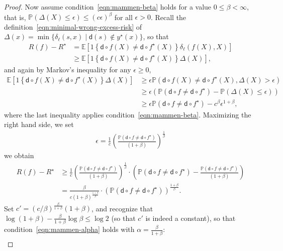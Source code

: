 \documentclass[10pt,a4paper]{amsart}
\newcommand{\E}{\mathbb{E}} %
\renewcommand{\P}{\mathbb{P}} %
\newcommand{\brk}[1]{\left[{#1}\right]} %
\newcommand{\extloss}{\delta_\tloss}
\newcommand{\indic}[1]{1\!\left\{#1\right\}} %
\newcommand{\opt}{^\star} %
\newcommand{\pred}{\mathsf{d}}  %
\newcommand{\prn}[1]{\left({#1}\right)} %
\newcommand{\tloss}{\ell}  %
\begin{document}
\begin{proof}
  Now assume condition~\eqref{eqn:mammen-beta} holds for a value $0 \le \beta
  < \infty$, that is, $\P(\Delta(X) \leq \epsilon) \leq (c \epsilon)^\beta$
  for all $\epsilon > 0$.
  Recall the definition~\eqref{eqn:minimal-wrong-excess-risk}
  of $\Delta(x) = \min\{\extloss(s, x)
  \mid \pred(s) \not \in y\opt(x)\}$,
  so that
  \begin{align*}
    R(f) - R^\star
    & = \mathbb{E} \brk{\indic{\pred \circ f(X) \neq \pred \circ f^\star(X)}
      \extloss(f(X),X) } \\
    & \geq \mathbb{E} \brk{\indic{\pred \circ f(X) \neq \pred \circ f^\star(X)}
      \Delta(X) },
  \end{align*}
  and again by Markov's inequality for any $\epsilon \ge 0$,
  \begin{align}
    \E \brk{\indic{\pred \circ f(X) \neq \pred \circ f^\star(X)} \Delta(X)}
    & \geq  \epsilon \P(\pred \circ f(X) \neq \pred \circ f^\star(X),
    \Delta(X) > \epsilon) \nonumber \\
    & \geq \epsilon \prn{\mathbb{P}(\pred \circ f \neq \pred \circ f^\star)
      - \P(\Delta(X) \leq \epsilon)} \label{eqn:pinto-noir} \\
    & \geq \epsilon \P(\pred \circ f \neq \pred \circ f^\star)
    - c^\beta \epsilon^{1+\beta}, \nonumber
  \end{align}
  where the last inequality applies condition~\eqref{eqn:mammen-beta}.
  Maximizing the right hand side, we set
  \begin{align*}
    \epsilon = \frac{1}{c}\prn{\frac{\P(\pred \circ f \neq \pred \circ f^\star)}{
        (1+\beta)}}^{\frac{1}{\beta}}
  \end{align*}
  we obtain
  \begin{align*}
    R(f) - R^\star
    & \geq \frac{1}{c}
    \prn{\frac{\P(\pred \circ f \neq \pred \circ f^\star)}{
        (1+\beta)}}^{\frac{1}{\beta}}
    \cdot \prn{ \P(\pred \circ f \neq \pred \circ f^\star)
      - \frac{\P(\pred \circ f \neq \pred \circ f^\star)}{(1+\beta)}} \\
    & = \frac{\beta}{c(1+\beta)^{\frac{1+\beta}{\beta}}} \cdot
    \prn{\P(\pred \circ f \neq \pred \circ f^\star)}^{\frac{1 + \beta}{\beta}}.
  \end{align*}
  Set $c' = (c/\beta)^{\frac{\beta}{1+\beta}}(1+\beta)$,
  and recognize that $\log(1 + \beta) - \frac{\beta}{1 + \beta} \log \beta
  \le \log 2$ (so that $c'$ is indeed a constant),
  so that condition~\eqref{eqn:mammen-alpha} holds
  with $\alpha = \frac{\beta}{1 + \beta}$:
  \begin{align*}

\end{align*}
\end{proof}
\end{document}
